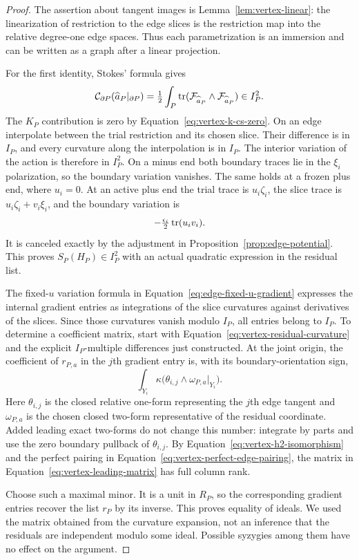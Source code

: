 \begin{proof}
The assertion about tangent images is Lemma~\ref{lem:vertex-linear}:
the linearization of restriction to the edge slices is the restriction
map into the relative degree-one edge spaces.  Thus each parametrization
is an immersion and can be written as a graph after a linear projection.

For the first identity, Stokes' formula gives
\[
 \mathcal C_{\partial P}(\widehat a_P|_{\partial P})
       =\tfrac12\int_P\operatorname{tr}(\mathcal F_{\widehat a_P}
                              \wedge\mathcal F_{\widehat a_P})
       \in I_P^2.
\]
The $K_P$ contribution is zero by Equation~\eqref{eq:vertex-k-cs-zero}.  On an
edge interpolate between the trial restriction and its chosen slice.
Their difference is in $I_P$, and every curvature along the interpolation
is in $I_P$.  The interior variation of the action is therefore in
$I_P^2$.  On a minus end both boundary traces lie in the $\xi_i$
polarization, so the boundary variation vanishes.  The same holds at a
frozen plus end, where $u_i=0$.  At an active plus end the trial trace
is $u_i\zeta_i$, the slice trace is $u_i\zeta_i+v_i\xi_i$, and the
boundary variation is
\[
 -\tfrac{\epsilon_i}{2}\operatorname{tr}(u_i v_i).
\]
It is canceled exactly by the adjustment in
Proposition~\ref{prop:edge-potential}.  This proves $S_P(H_P)\in I_P^2$
with an actual quadratic expression in the residual list.

The fixed-$u$ variation formula in Equation~\eqref{eq:edge-fixed-u-gradient} expresses the
internal gradient entries as integrations of the slice curvatures
against derivatives of the slices.  Since those curvatures vanish
modulo $I_P$, all entries belong to $I_P$.  To determine a coefficient
matrix, start with Equation~\eqref{eq:vertex-residual-curvature} and the explicit
$I_P$-multiple differences just constructed.  At the joint origin, the
coefficient of $r_{P,a}$ in the $j$th gradient entry is, with its
boundary-orientation sign,
\begin{equation}
\label{eq:vertex-leading-matrix}
 \int_{Y_i}\kappa\bigl(\theta_{i,j}\wedge
                     \omega_{P,a}|_{Y_i}\bigr).
\end{equation}
Here $\theta_{i,j}$ is the closed relative one-form representing the
$j$th edge tangent and $\omega_{P,a}$ is the chosen closed two-form
representative of the residual coordinate.  Added leading exact
two-forms do not change this number: integrate by parts and use the
zero boundary pullback of $\theta_{i,j}$.  By
Equation~\eqref{eq:vertex-h2-isomorphism} and the perfect pairing in
Equation~\eqref{eq:vertex-perfect-edge-pairing}, the matrix in
Equation~\eqref{eq:vertex-leading-matrix} has full column rank.

Choose such a maximal minor.  It is a unit in $R_P$, so the corresponding
gradient entries recover the list $r_P$ by its inverse.  This proves
equality of ideals.  We used the matrix obtained from the curvature
expansion, not an inference that the residuals are independent modulo
some ideal.  Possible syzygies among them have no effect on the argument.
\end{proof}

